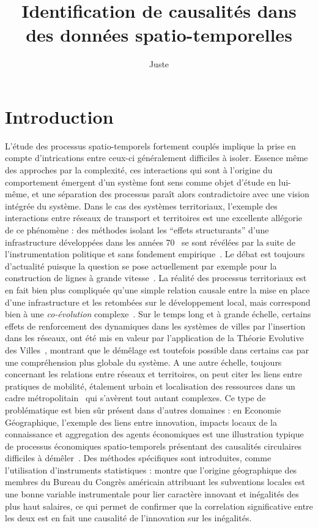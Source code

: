\documentclass[french]{./sageo}
\title[Causalités Spatio-temporelles]{Identification de causalités dans des données spatio-temporelles}
\author[1,2]{Juste}{Raimbault}
\begin{document}
\maketitle

\newpage



\section{Introduction}



L'étude des processus spatio-temporels fortement couplés implique la prise en compte d'intrications entre ceux-ci généralement difficiles à isoler. Essence même des approches par la complexité, ces interactions qui sont à l'origine du comportement émergent d'un système font sens comme objet d'étude en lui-même, et une séparation des processus paraît alors contradictoire avec une vision intégrée du système. Dans le cas des systèmes territoriaux, l'exemple des interactions entre réseaux de transport et territoires est une excellente allégorie de ce phénomène : des méthodes isolant les ``effets structurants'' d'une infrastructure développées dans les années 70~\cite{bonnafous1974methodologies} se sont révélées par la suite de l'instrumentation politique et sans fondement empirique~\cite{offner1993effets}. Le débat est toujours d'actualité puisque la question se pose actuellement par exemple pour la construction de lignes à grande vitesse~\cite{crozethalshs01094554}. La réalité des processus territoriaux est en fait bien plus compliquée qu'une simple relation causale entre la mise en place d'une infrastructure et les retombées sur le développement local, mais correspond bien à une \emph{co-évolution} complexe~\cite{bretagnolletel00459720}. Sur le temps long et à grande échelle, certains effets de renforcement des dynamiques dans les systèmes de villes par l'insertion dans les réseaux, ont été mis en valeur par l'application de la Théorie Evolutive des Villes~\cite{espacegeo2014effets}, montrant que le démêlage est toutefois possible dans certains cas par une compréhension plus globale du système. A une autre échelle, toujours concernant les relations entre réseaux et territoires, on peut citer les liens entre pratiques de mobilité, étalement urbain et localisation des ressources dans un cadre métropolitain~\cite{cerqueira2017inegalites} qui s'avèrent tout autant complexes. Ce type de problématique est bien sûr présent dans d'autres domaines : en Economie Géographique, l'exemple des liens entre innovation, impacts locaux de la connaissance et aggregation des agents économiques est une illustration typique de processus économiques spatio-temporels présentant des causalités circulaires difficiles à démêler~\cite{audretsch1996r}. Des méthodes spécifiques sont introduites, comme l'utilisation d'instruments statistiques : \cite{aghion2015innovation} montre que l'origine géographique des membres du Bureau du Congrès américain attribuant les subventions locales est une bonne variable instrumentale pour lier caractère innovant et inégalités des plus haut salaires, ce qui permet de confirmer que la correlation significative entre les deux est en fait une causalité de l'innovation sur les inégalités.
\end{document}
